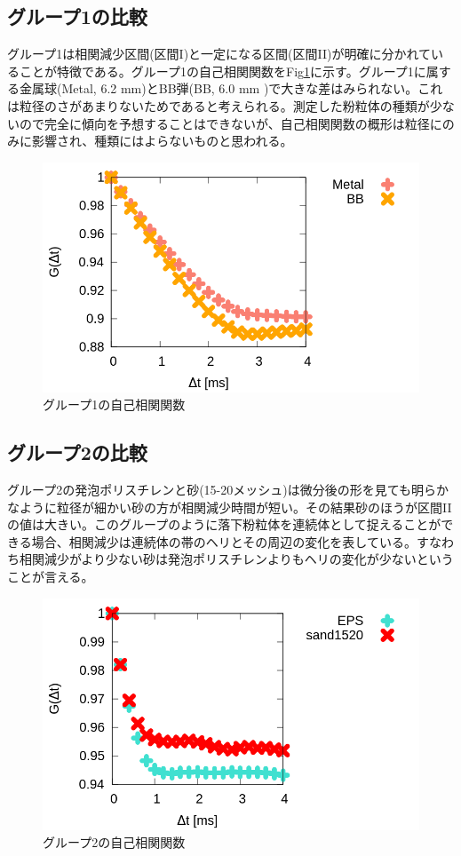 \documentclass[a4paper,12pt,dvipdfmx]{jsarticle}
\newcommand{\II}{I\hspace{-.1em}I}
\begin{document}
\subsection{グループ1の比較}
グループ1は相関減少区間(区間I)と一定になる区間(区間\II )が明確に分かれていることが特徴である。グループ1の自己相関関数をFig\ref{fig:one}に示す。グループ1に属する金属球(Metal, 6.2 mm)とBB弾(BB, 6.0 mm )で大きな差はみられない。これは粒径のさがあまりないためであると考えられる。測定した粉粒体の種類が少ないので完全に傾向を予想することはできないが、自己相関関数の概形は粒径にのみに影響され、種類にはよらないものと思われる。
\begin{figure}[H]
	\includegraphics[scale=0.4]{one.png}
	\caption{グループ1の自己相関関数}
	\label{fig:one}
\end{figure}
\subsection{グループ2の比較}
グループ2の発泡ポリスチレンと砂(15-20メッシュ)は微分後の形を見ても明らかなように粒径が細かい砂の方が相関減少時間が短い。その結果砂のほうが区間\II の値は大きい。このグループのように落下粉粒体を連続体として捉えることができる場合、相関減少は連続体の帯のヘリとその周辺の変化を表している。すなわち相関減少がより少ない砂は発泡ポリスチレンよりもヘリの変化が少ないということが言える。
\begin{figure}[H]
	\includegraphics[scale=0.4]{two_big.png}
	\caption{グループ2の自己相関関数}
	\label{fig:two}
\end{figure}
\end{document}
